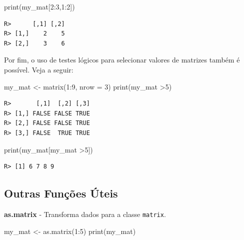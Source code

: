\documentclass[
  11pt,
]{book}
\newenvironment{Shaded}{\begin{snugshade}}{\end{snugshade}}
\newcommand{\AttributeTok}[1]{\textcolor[rgb]{0.61,0.61,0.61}{#1}}
\newcommand{\DecValTok}[1]{\textcolor[rgb]{0.06,0.06,0.06}{#1}}
\newcommand{\FunctionTok}[1]{\textcolor[rgb]{0,0,0}{#1}}
\newcommand{\NormalTok}[1]{#1}
\newcommand{\OtherTok}[1]{\textcolor[rgb]{0.37,0.37,0.37}{#1}}
\newcommand{\SpecialCharTok}[1]{\textcolor[rgb]{0,0,0}{#1}}
\begin{document}
\begin{Shaded}
\begin{Highlighting}[]
\FunctionTok{print}\NormalTok{(my\_mat[}\DecValTok{2}\SpecialCharTok{:}\DecValTok{3}\NormalTok{,}\DecValTok{1}\SpecialCharTok{:}\DecValTok{2}\NormalTok{])}
\end{Highlighting}
\end{Shaded}

\begin{verbatim}
R>      [,1] [,2]
R> [1,]    2    5
R> [2,]    3    6
\end{verbatim}

Por fim, o uso de testes lógicos para selecionar valores de matrizes também é possível. Veja a seguir:

\begin{Shaded}
\begin{Highlighting}[]
\NormalTok{my\_mat }\OtherTok{\textless{}{-}} \FunctionTok{matrix}\NormalTok{(}\DecValTok{1}\SpecialCharTok{:}\DecValTok{9}\NormalTok{, }\AttributeTok{nrow =} \DecValTok{3}\NormalTok{)}
\FunctionTok{print}\NormalTok{(my\_mat }\SpecialCharTok{\textgreater{}}\DecValTok{5}\NormalTok{)}
\end{Highlighting}
\end{Shaded}

\begin{verbatim}
R>       [,1]  [,2] [,3]
R> [1,] FALSE FALSE TRUE
R> [2,] FALSE FALSE TRUE
R> [3,] FALSE  TRUE TRUE
\end{verbatim}

\begin{Shaded}
\begin{Highlighting}[]
\FunctionTok{print}\NormalTok{(my\_mat[my\_mat }\SpecialCharTok{\textgreater{}}\DecValTok{5}\NormalTok{])}
\end{Highlighting}
\end{Shaded}

\begin{verbatim}
R> [1] 6 7 8 9
\end{verbatim}

\hypertarget{outras-funuxe7uxf5es-uxfateis-2}{%
\subsection{Outras Funções Úteis}\label{outras-funuxe7uxf5es-uxfateis-2}}

\textbf{as.matrix} - Transforma dados para a classe \texttt{matrix}.

\begin{Shaded}
\begin{Highlighting}[]
\NormalTok{my\_mat }\OtherTok{\textless{}{-}} \FunctionTok{as.matrix}\NormalTok{(}\DecValTok{1}\SpecialCharTok{:}\DecValTok{5}\NormalTok{)}
\FunctionTok{print}\NormalTok{(my\_mat)}
\end{Highlighting}
\end{Shaded}
\end{document}
